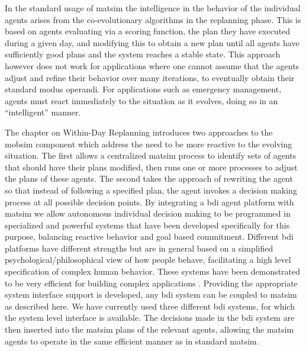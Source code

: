 In the standard usage of \gls{matsim} the intelligence in the behavior of
the individual agents arises from the  co-evolutionary algorithms in
the replanning phase. This is based on agents evaluating via a scoring
function, the plan they have executed during a given day, and
modifying this to obtain a new plan until all agents have sufficiently good
plans and the system reaches a stable state. This approach however
does not work for applications where one cannot assume that the agents
adjust and refine their behavior over many iterations, to eventually
obtain their standard modus operandi. For applications such as
emergency management, agents must react immediately to the situation
as it evolves, doing so in an ``intelligent'' manner. 

The chapter on Within-Day Replanning introduces two approaches to the
\gls{mobsim} component which address the need to be more reactive to the
evolving situation. The first allows a centralized \gls{matsim} process to
identify sets of agents that should have their plans modified, then
runs one or more processes to adjust the plans of these agents. The
second takes the approach of rewriting the agent so that instead of
following a specified plan, the agent invokes a decision making
process at all possible decision points. By integrating a \gls{bdi} agent
platform with \gls{matsim} \cite{ecai} we allow autonomous individual
decision making to be programmed in specialized and powerful systems
that have been developed specifically for this purpose, balancing
reactive behavior and goal based commitment. Different \gls{bdi} platforms
have different strengths but are in general based on a simplified
psychological/philosophical view of how people behave, facilitating a
high level specification of complex human behavior. These systems have
been demonstrated to be very efficient for building complex
applications \cite{benfield}.  Providing the appropriate system
interface support is developed, any \gls{bdi} system can be coupled to
\gls{matsim} as described here. We have currently used three different \gls{bdi}
systems, for which the system level interface is available.  The
decisions made in the \gls{bdi} system are then inserted into the \gls{matsim}
plans of the relevant agents, allowing the \gls{matsim} agents to operate in
the same efficient manner as in standard \gls{matsim}.

